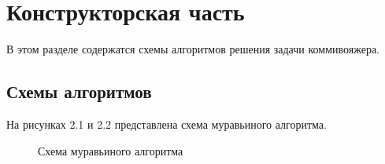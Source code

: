 \documentclass[a4paper,12pt]{report}
\begin{document}
\chapter{Конструкторская часть}
\hspace{0.6cm}В этом разделе содержатся схемы алгоритмов решения задачи коммивояжера.

\section{Схемы алгоритмов}

\hspace{0.6cm}На рисунках 2.1 и 2.2 представлена схема муравьиного алгоритма.

\begin{figure}[ht!]
\caption{Схема муравьиного алгоритма}
\end{figure}
\end{document}
